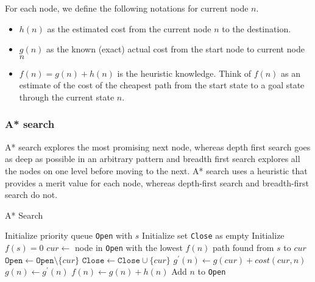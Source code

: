                 For each node, we define the following notations for current node $n$.

                \begin{itemize}
                    \item $h(n)$ as the estimated cost from the current node $n$ to the destination.
                    \item $g(n)$ as the known (exact) actual cost from the start node to current node $n$
                    \item $f(n) = g(n) + h(n)$ is the heuristic knowledge. Think of $f(n)$ as an estimate of the cost of the cheapest path from the start state to a goal state through the current state $n$.
                \end{itemize}

                \subsubsection{A* search}
                    A* search explores the most promising next node, whereas depth first search goes as deep as possible in an arbitrary pattern and breadth first search explores all the nodes on one level before moving to the next. A* search uses a heuristic that provides a merit value for each node, whereas depth-first search and breadth-first search do not.

                    \begin{algorithm}
                        \centering
                        \caption{A* Search}
                        \begin{algorithmic}[1]
                        \State Initialize priority queue \texttt{Open} with $s$
                        \State Initialize set \texttt{Close} as empty
                        \State Initialize $f(s) = 0$
                            \State $cur \gets$ node in \texttt{Open} with the lowest $f(n)$
                                \State \Return path found from $s$ to $cur$
                            \EndIf
                            \State $\texttt{Open} \gets \texttt{Open}\setminus \{cur\}$
                            \State $\texttt{Close} \gets \texttt{Close} \cup \{cur\}$
                                    \State $g^\prime(n) \gets g(cur) + cost(cur, n)$
                                        \State $g(n) \gets g^\prime(n)$
                                        \State $f(n) \gets g(n) + h(n)$
                                            \State Add $n$ to \texttt{Open}
                                        \EndIf
                                    \EndIf
                                \EndIf
                            \EndFor
                        \EndWhile
                        \end{algorithmic}
                    \end{algorithm}

